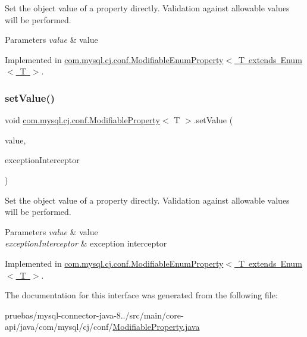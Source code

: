 Set the object value of a property directly. Validation against allowable values will be performed.


\begin{DoxyParams}{Parameters}
{\em value} & value \\
\hline
\end{DoxyParams}


Implemented in \mbox{\hyperlink{classcom_1_1mysql_1_1cj_1_1conf_1_1_modifiable_enum_property_a75933d467e8ce6bf8da46c21e3177e0f}{com.\+mysql.\+cj.\+conf.\+Modifiable\+Enum\+Property$<$ T extends Enum$<$ T $>$}}.

\mbox{\label{interfacecom_1_1mysql_1_1cj_1_1conf_1_1_modifiable_property_a26fe9373efcddc22eb1fc1234eae81ed}} 
\subsubsection{\texorpdfstring{set\+Value()}{setValue()}\hspace{0.1cm}{\footnotesize\ttfamily [2/2]}}
{\footnotesize\ttfamily void \mbox{\hyperlink{interfacecom_1_1mysql_1_1cj_1_1conf_1_1_modifiable_property}{com.\+mysql.\+cj.\+conf.\+Modifiable\+Property}}$<$ T $>$.set\+Value (\begin{DoxyParamCaption}\item[{T}]{value,  }\item[{\mbox{\hyperlink{interfacecom_1_1mysql_1_1cj_1_1exceptions_1_1_exception_interceptor}{Exception\+Interceptor}}}]{exception\+Interceptor }\end{DoxyParamCaption})}

Set the object value of a property directly. Validation against allowable values will be performed.


\begin{DoxyParams}{Parameters}
{\em value} & value \\
\hline
{\em exception\+Interceptor} & exception interceptor \\
\hline
\end{DoxyParams}


Implemented in \mbox{\hyperlink{classcom_1_1mysql_1_1cj_1_1conf_1_1_modifiable_enum_property_aeb04443d10144806024e2a28bf4942de}{com.\+mysql.\+cj.\+conf.\+Modifiable\+Enum\+Property$<$ T extends Enum$<$ T $>$}}.



The documentation for this interface was generated from the following file\+:\begin{DoxyCompactItemize}
\item 
pruebas/mysql-\/connector-\/java-\/8../src/main/core-\/api/java/com/mysql/cj/conf/\mbox{\hyperlink{_modifiable_property_8java}{Modifiable\+Property.\+java}}\end{DoxyCompactItemize}
